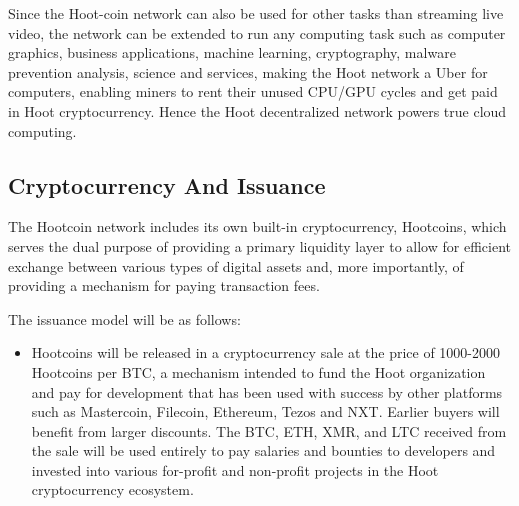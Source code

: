 \documentclass{article}
\begin{document}
Since the Hoot-coin network can also be used for other tasks than streaming live video, the network can be extended to run any computing task such as computer graphics, business applications, machine learning, cryptography, malware prevention analysis, science and services, making the Hoot network a Uber for computers, enabling miners to rent their unused CPU/GPU cycles and get paid in Hoot cryptocurrency. Hence the Hoot decentralized network powers true cloud computing.

\subsection{Cryptocurrency And Issuance}

The Hootcoin network includes its own built-in cryptocurrency, Hootcoins, which serves the dual purpose of providing a primary liquidity layer to allow for efficient exchange between various types of digital assets and, more importantly, of providing a mechanism for paying transaction fees.

The issuance model will be as follows:

\begin{itemize}

\item Hootcoins will be released in a cryptocurrency sale at the price of 1000-2000 Hootcoins per BTC, a mechanism intended to fund the Hoot organization and pay for development that has been used with success by other platforms such as Mastercoin, Filecoin, Ethereum, Tezos and NXT. Earlier buyers will benefit from larger discounts. The BTC, ETH, XMR, and LTC received from the sale will be used entirely to pay salaries and bounties to developers and invested into various for-profit and non-profit projects in the Hoot cryptocurrency ecosystem.

\end{itemize}
\end{document}
